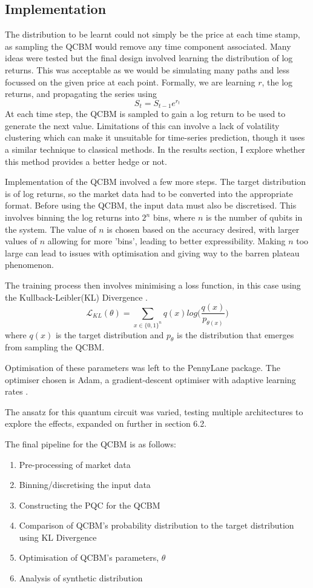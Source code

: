 \documentclass[12pt]{article}
\newcommand{\newp}
    {
    \vskip 0.5cm 
  }
\numberwithin{equation}{section}
\begin{document}
\subsection{Implementation}
The distribution to be learnt could not simply be the price at each time stamp, 
as sampling the QCBM would remove any time component associated. Many ideas were tested 
but the final design involved learning the distribution of log returns. This was 
acceptable as we would be simulating many paths and less focussed on the given 
price at each point. Formally, we are learning $r$, the log returns, and propagating 
the series using 
\begin{equation}
  S_t = S_{t-1}e^{r_t}
\end{equation}
At each time step, the QCBM is sampled to gain a log return to be used to generate 
the next value. Limitations of this can involve a lack of volatility clustering which 
can make it unsuitable for time-series prediction, though it uses a similar technique 
to classical methods. In the results section, I explore whether this method provides a better hedge or not.
\newp
Implementation of the QCBM involved a few more steps. The target distribution 
is of log returns, so the market data had to be converted into the appropriate 
format. Before using the QCBM, the input data must also be discretised. This 
involves binning the log returns into $2^n$ bins, where $n$ is the number of 
qubits in the system. The value of $n$ is chosen based on the accuracy desired, 
with larger values of $n$ allowing for more 'bins', leading to better expressibility.
Making $n$ too large can lead to issues with optimisation and giving way to the 
barren plateau phenomenon.
\newp
The training process then involves minimising a loss function, in this case using 
the Kullback-Leibler(KL) Divergence \autocite{a248}. 
\begin{equation}
\mathcal{L}_{KL}(\theta) = \sum_{x \in \{0,1\}^n}q(x)log\bigl( \frac{q(x)}{p_{\theta(x)}}\bigr)
\end{equation}
where $q(x)$ is the target distribution and $p_{\theta}$ is the distribution that 
emerges from sampling the QCBM.
\newp
Optimisation of these parameters was left to the PennyLane\autocite{pennylane} package. 
The optimiser chosen is Adam, a gradient-descent optimiser with adaptive 
learning rates \autocite{kingma_2014_adam}.
\newp
The ansatz for this quantum circuit was varied, testing multiple architectures
to explore the effects, expanded on further in section 6.2.
\newp
The final pipeline for the QCBM is as follows:
\begin{enumerate}
  \item Pre-processing of market data
  \item Binning/discretising the input data
  \item Constructing the PQC for the QCBM
  \item Comparison of QCBM's probability distribution to the target distribution using
  KL Divergence
  \item Optimisation of QCBM's parameters, $\theta$
  \item Analysis of synthetic distribution
\end{enumerate}
\end{document}
